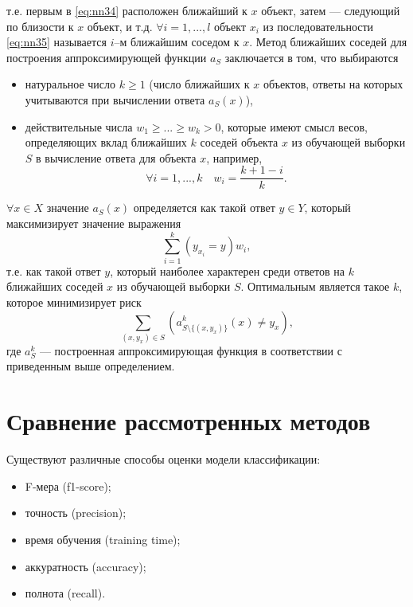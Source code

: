 т.е. первым в \ref*{eq:nn34} расположен ближайший к $x$ объект, затем --- следующий по близости к $x$ объект, и т.д. $\forall i = 1,...,l$ объект $x_i$ из последовательности \ref*{eq:nn35} называется $i$–м ближайшим соседом к $x$.
Метод ближайших соседей для построения аппроксимирующей функции $a_S$ заключается в том, что выбираются 
\begin{itemize}
    \item натуральное число $k \geq 1 $ (число ближайших к $x$ объектов, ответы на которых учитываются при вычислении ответа $a_S(x)$),
    \item действительные числа $w_1 \geq ... \geq w_k > 0$, которые имеют смысл весов, определяющих вклад ближайших $k$ соседей объекта $x$ из обучающей выборки $S$ в вычисление ответа для объекта $x$, например,
    \begin{equation}
        \label{eq:nn36}
        \forall i = 1,...,k \quad w_i = \frac{k + 1 - i}{k}.
    \end{equation}
\end{itemize}
$\forall x \in X$ значение $a_S(x)$ определяется как такой ответ $y \in Y$, который максимизирует значение выражения
\begin{equation}
    \label{eq:nn37}
    \sum_{i=1}^{k}(y_{x_i}=y)w_i,
\end{equation}
т.е. как такой ответ $y$, который наиболее характерен среди ответов на $k$ ближайших соседей $x$ из обучающей выборки $S$.
Оптимальным является такое $k$, которое минимизирует риск
\begin{equation}
    \label{eq:nn38}
    \sum_{(x,y_x)\in S}^{}(a^k_{S \setminus \{(x,y_x)\}}(x) \ne y_x),
\end{equation}
где $a^k_S$ --- построенная аппроксимирующая функция в соответствии с приведенным выше определением.




\section{Сравнение рассмотренных методов}


Существуют различные способы оценки модели
классификации:

\begin{itemize}
    \item F-мера (f1-score);
    \item точность (precision);
    \item время обучения (training time);
    \item аккуратность (accuracy);
    \item полнота (recall).
\end{itemize}


